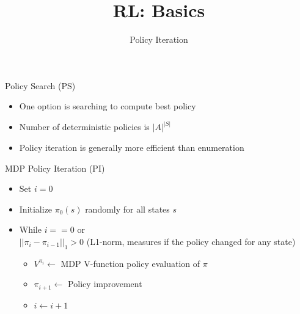 


\title[Reinforcement Learning: Basics]{RL: Basics}
\subtitle{Policy Iteration}




	
	\maketitle

\begin{frame}[c]{Policy Search (PS)}

\begin{itemize}
	\item One option is searching to compute best policy
	\item Number of deterministic policies is $|A|^{|S|}$
	\item Policy iteration is generally more efficient than enumeration
\end{itemize}

\end{frame}
\begin{frame}[c]{MDP Policy Iteration (PI)}

\begin{itemize}
	\item Set $i=0$
	\item Initialize $\pi_0(s)$ randomly for all states $s$
	\item While $i == 0$ or\\ $||\pi_i - \pi_{i-1}||_1 > 0$ (L1-norm, measures if the policy changed for any state)
	\begin{itemize}
		\item $V^{\pi_i} \gets$ MDP V-function policy evaluation of $\pi$
		\item $\pi_{i+1} \gets$ Policy improvement
		\item $i \gets i+1$
	\end{itemize}
\end{itemize}

\end{frame}
